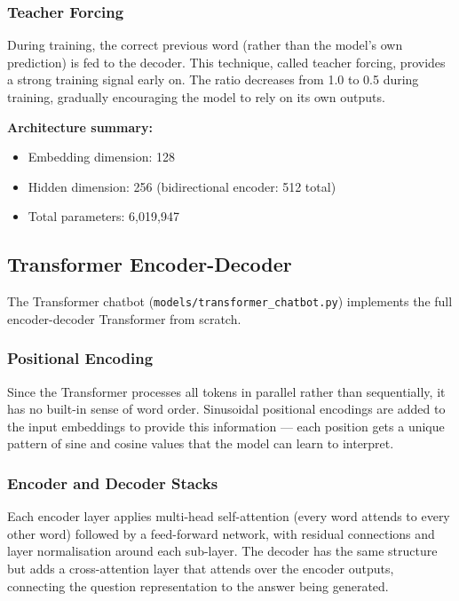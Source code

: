 \subsubsection*{Teacher Forcing}

During training, the correct previous word (rather than the model's own
prediction) is fed to the decoder. This technique, called teacher forcing,
provides a strong training signal early on. The ratio decreases from 1.0 to 0.5
during training, gradually encouraging the model to rely on its own outputs.

\textbf{Architecture summary:}
\begin{itemize}
    \item Embedding dimension: 128
    \item Hidden dimension: 256 (bidirectional encoder: 512 total)
    \item Total parameters: 6,019,947
\end{itemize}

\subsection{Transformer Encoder-Decoder}

The Transformer chatbot (\texttt{models/transformer\_chatbot.py}) implements the
full encoder-decoder Transformer \cite{vaswani2017} from scratch.

\subsubsection*{Positional Encoding}

Since the Transformer processes all tokens in parallel rather than sequentially,
it has no built-in sense of word order. Sinusoidal positional encodings are added
to the input embeddings to provide this information — each position gets a unique
pattern of sine and cosine values that the model can learn to interpret.

\subsubsection*{Encoder and Decoder Stacks}

Each encoder layer applies multi-head self-attention (every word attends to every
other word) followed by a feed-forward network, with residual connections and
layer normalisation around each sub-layer. The decoder has the same structure but
adds a cross-attention layer that attends over the encoder outputs, connecting the
question representation to the answer being generated.

